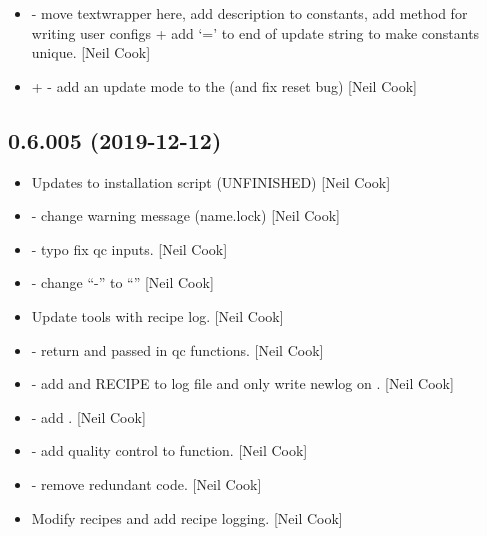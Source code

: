 \documentclass[a4paper,10pt,english]{report}
\begin{document}
\begin{itemize}
\item {} 
 - move textwrapper here, add
description to constants, add  method for writing user
configs + add ‘=’ to end of update string to make constants unique.
{[}Neil Cook{]}

\item {} 
 +  - add an update mode to the
 (and fix reset bug) {[}Neil Cook{]}

\end{itemize}


\subsection{0.6.005 (2019-12-12)}
\label{\detokenize{misc/changelog:id14}}\begin{itemize}
\item {} 
Updates to installation script (UNFINISHED) {[}Neil Cook{]}

\item {} 
 - change warning message (name.lock) {[}Neil Cook{]}

\item {} 
 - typo fix qc inputs. {[}Neil Cook{]}

\item {} 
 - change “-” to “\textendash{}” {[}Neil Cook{]}

\item {} 
Update tools with recipe log. {[}Neil Cook{]}

\item {} 
 - return  and passed in qc
functions. {[}Neil Cook{]}

\item {} 
 - add  and RECIPE to log file and only write
newlog on . {[}Neil Cook{]}

\item {} 
 - add . {[}Neil Cook{]}

\item {} 
 - add quality control to function.
{[}Neil Cook{]}

\item {} 
 - remove redundant code. {[}Neil Cook{]}

\item {} 
Modify recipes and add recipe logging. {[}Neil Cook{]}

\end{itemize}
\end{document}
